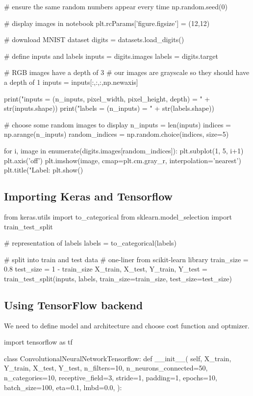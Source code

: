 \documentclass[%
oneside,                 %
final,                   %
10pt]{article}
\begin{document}
# ensure the same random numbers appear every time
np.random.seed(0)

# display images in notebook
plt.rcParams['figure.figsize'] = (12,12)


# download MNIST dataset
digits = datasets.load_digits()

# define inputs and labels
inputs = digits.images
labels = digits.target

# RGB images have a depth of 3
# our images are grayscale so they should have a depth of 1
inputs = inputs[:,:,:,np.newaxis]

print("inputs = (n_inputs, pixel_width, pixel_height, depth) = " + str(inputs.shape))
print("labels = (n_inputs) = " + str(labels.shape))


# choose some random images to display
n_inputs = len(inputs)
indices = np.arange(n_inputs)
random_indices = np.random.choice(indices, size=5)

for i, image in enumerate(digits.images[random_indices]):
    plt.subplot(1, 5, i+1)
    plt.axis('off')
    plt.imshow(image, cmap=plt.cm.gray_r, interpolation='nearest')
    plt.title("Label: %
plt.show()
\epycod


\subsection{Importing Keras and Tensorflow}
\bpycod
from keras.utils import to_categorical
from sklearn.model_selection import train_test_split

# representation of labels
labels = to_categorical(labels)

# split into train and test data
# one-liner from scikit-learn library
train_size = 0.8
test_size = 1 - train_size
X_train, X_test, Y_train, Y_test = train_test_split(inputs, labels, train_size=train_size,
                                                    test_size=test_size)
\epycod

\subsection{Using TensorFlow backend}

We need to define model and architecture and choose cost function and optmizer.
\bpycid

import tensorflow as tf

class ConvolutionalNeuralNetworkTensorflow:
    def __init__(
        self,
        X_train,
        Y_train,
        X_test,
        Y_test,
        n_filters=10,
        n_neurons_connected=50,
        n_categories=10,
        receptive_field=3,
        stride=1,
        padding=1,
        epochs=10,
        batch_size=100,
        eta=0.1,
        lmbd=0.0,
    ):
        
\end{document}
